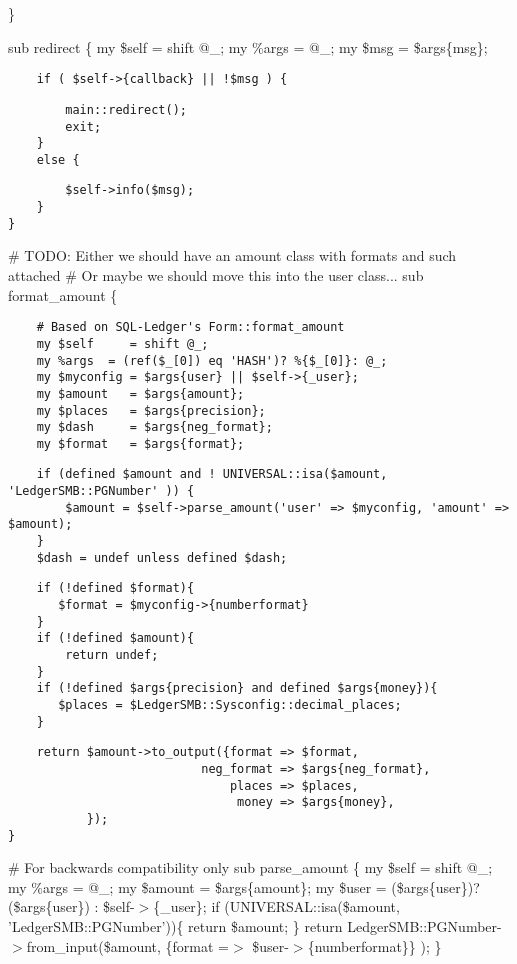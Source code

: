 \}



sub redirect \{
    my \$self = shift @\_;
    my \%args = @\_;
    my \$msg  = \$args\{msg\};

\begin{verbatim}
    if ( $self->{callback} || !$msg ) {
\end{verbatim}
\begin{verbatim}
        main::redirect();
        exit;
    }
    else {
\end{verbatim}
\begin{verbatim}
        $self->info($msg);
    }
}
\end{verbatim}


\# TODO:  Either we should have an amount class with formats and such attached
\# Or maybe we should move this into the user class...
sub format\_amount \{

\begin{verbatim}
    # Based on SQL-Ledger's Form::format_amount
    my $self     = shift @_;
    my %args  = (ref($_[0]) eq 'HASH')? %{$_[0]}: @_;
    my $myconfig = $args{user} || $self->{_user};
    my $amount   = $args{amount};
    my $places   = $args{precision};
    my $dash     = $args{neg_format};
    my $format   = $args{format};
\end{verbatim}
\begin{verbatim}
    if (defined $amount and ! UNIVERSAL::isa($amount, 'LedgerSMB::PGNumber' )) {
        $amount = $self->parse_amount('user' => $myconfig, 'amount' => $amount);
    }
    $dash = undef unless defined $dash;
\end{verbatim}
\begin{verbatim}
    if (!defined $format){
       $format = $myconfig->{numberformat}
    }
    if (!defined $amount){
        return undef;
    }
    if (!defined $args{precision} and defined $args{money}){
       $places = $LedgerSMB::Sysconfig::decimal_places;
    }
\end{verbatim}
\begin{verbatim}
    return $amount->to_output({format => $format, 
                           neg_format => $args{neg_format}, 
                               places => $places,
                                money => $args{money},
           });
}
\end{verbatim}


\# For backwards compatibility only
sub parse\_amount \{
    my \$self     = shift @\_;
    my \%args     = @\_;
    my \$amount   = \$args\{amount\};
    my \$user     = (\$args\{user\})? (\$args\{user\}) : \$self-$>$\{\_user\};
    if (UNIVERSAL::isa(\$amount, 'LedgerSMB::PGNumber'))\{
        return \$amount;
    \} 
    return LedgerSMB::PGNumber-$>$from\_input(\$amount, 
                                     \{format =$>$ \$user-$>$\{numberformat\}\}
    ); 
\}



